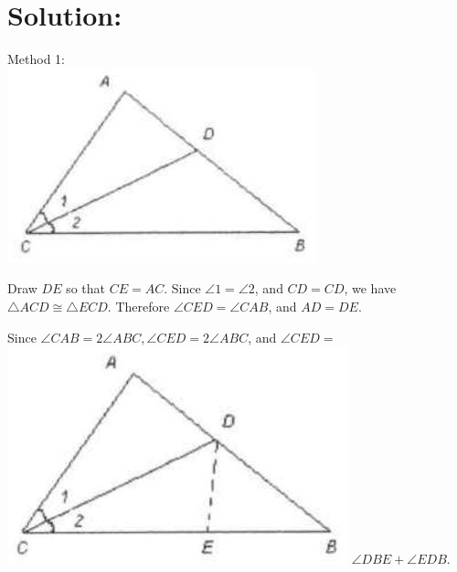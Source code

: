 \documentclass[10pt]{article}
\begin{document}
\section*{Solution:}
Method 1:\\
\includegraphics[max width=\textwidth, center]{2025_04_17_97bc1f7e44d93c271a88g-056}

Draw \(D E\) so that \(C E=A C\). Since \(\angle 1=\angle 2\), and \(C D=C D\), we have \(\triangle A C D \cong \triangle E C D\). Therefore \(\angle C E D=\angle C A B\), and \(A D=D E\).

Since \(\angle C A B=2 \angle A B C, \angle C E D=2 \angle A B C\), and \(\angle C E D=\)\\
\includegraphics[max width=\textwidth]{2025_04_17_97bc1f7e44d93c271a88g-056(1)} \(\angle D B E+\angle E D B\).
\end{document}
